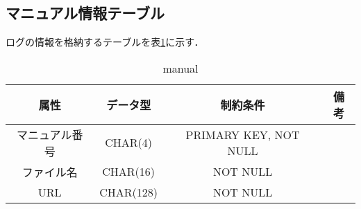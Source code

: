 \documentclass[../main]{subfiles}
\begin{document}
\subsection{マニュアル情報テーブル}
ログの情報を格納するテーブルを表\ref{fig:data_man}に示す．

\begin{table}[H]
\begin{center}
    \begin{tabular}{|c|c|c|c|}
    \hline
    属性       & データ型      &  制約条件     & 備考 \\ \hline \hline
    マニュアル番号 & CHAR(4)          &  PRIMARY KEY, NOT NULL   &   \\ \hline
    ファイル名 & CHAR(16)          &  NOT NULL   &   \\ \hline
    URL       & CHAR(128)          &  NOT NULL   &   \\ \hline
    \end{tabular}
\caption{manual}
\label{fig:data_man} 
\end{center}
\end{table}
\end{document}
